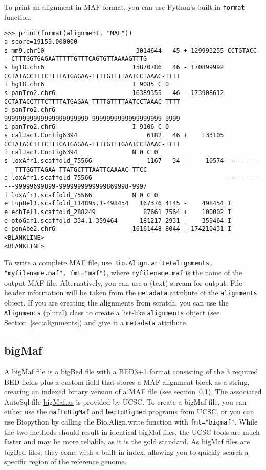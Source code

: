To print an alignment in MAF format, you can use Python's built-in \verb|format| function:
\begin{verbatim}
>>> print(format(alignment, "MAF"))
a score=19159.000000
s mm9.chr10                         3014644   45 + 129993255 CCTGTACC---CTTTGGTGAGAATTTTTGTTTCAGTGTTAAAAGTTTG
s hg18.chr6                        15870786   46 - 170899992 CCTATACCTTTCTTTTATGAGAA-TTTTGTTTTAATCCTAAAC-TTTT
i hg18.chr6                        I 9085 C 0
s panTro2.chr6                     16389355   46 - 173908612 CCTATACCTTTCTTTTATGAGAA-TTTTGTTTTAATCCTAAAC-TTTT
q panTro2.chr6                                               99999999999999999999999-9999999999999999999-9999
i panTro2.chr6                     I 9106 C 0
s calJac1.Contig6394                   6182   46 +    133105 CCTATACCTTTCTTTCATGAGAA-TTTTGTTTGAATCCTAAAC-TTTT
i calJac1.Contig6394               N 0 C 0
s loxAfr1.scaffold_75566               1167   34 -     10574 ------------TTTGGTTAGAA-TTATGCTTTAATTCAAAAC-TTCC
q loxAfr1.scaffold_75566                                     ------------99999699899-9999999999999869998-9997
i loxAfr1.scaffold_75566           N 0 C 0
e tupBel1.scaffold_114895.1-498454   167376 4145 -    498454 I
e echTel1.scaffold_288249             87661 7564 +    100002 I
e otoGar1.scaffold_334.1-359464      181217 2931 -    359464 I
e ponAbe2.chr6                     16161448 8044 - 174210431 I
<BLANKLINE>
<BLANKLINE>
\end{verbatim}
To write a complete MAF file, use \verb|Bio.Align.write(alignments, "myfilename.maf", fmt="maf")|, where \verb|myfilename.maf| is the name of the output MAF file. Alternatively, you can use a (text) stream for output. File header information will be taken from the \verb|metadata| attribute of the \verb|alignments| object. If you are creating the alignments from scratch, you can use the \verb|Alignments| (plural) class to create a list-like \verb|alignments| object (see Section~\ref{sec:alignments}) and give it a \verb|metadata| attribute.

\subsection{bigMaf}
\label{subsec:align_bigmaf}

A bigMaf file is a bigBed file with a BED3+1 format consisting of the 3 required BED fields plus a custom field that stores a MAF alignment block as a string, crearing an indexed binary version of a MAF file (see section~\ref{subsec:align_bigmaf}). The associated AutoSql file \href{https://genome.ucsc.edu/goldenPath/help/examples/bigMaf.as}{bigMaf.as} is provided by UCSC.
To create a bigMaf file, you can either use the \verb|mafToBigMaf| and \verb|bedToBigBed| programs from UCSC. or you can use Biopython by calling the Bio.Align.write function with \verb|fmt="bigmaf"|. While the two methods should result in identical bigMaf files, the UCSC tools are much faster and may be more reliable, as it is the gold standard. As bigMaf files are bigBed files, they come with a built-in index, allowing you to quickly search a specific region of the reference genome.

